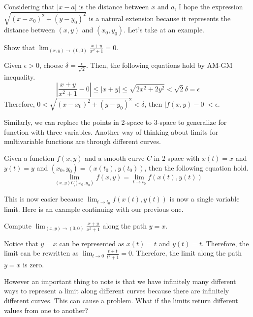 \documentclass[../../../main.tex]{subfiles}
\begin{document}
Considering that $|x - a|$ is the distance between $x$ and $a$,
I hope the expression $\sqrt{(x - x_0)^2 + (y - y_0)^2}$ is a
natural extension because it represents the distance between
$(x, y)$ and $(x_0, y_0)$. Let's take at an example.

\begin{problem}{}{}
Show that $\lim_{(x, y) \to (0, 0)} \frac{x + y}{x^2 + 1} = 0$.
\end{problem}
\begin{solution}
Given $\epsilon > 0$, choose $\delta = \frac{\epsilon}{\sqrt{2}}$.
Then, the following equations hold by AM-GM inequality.
\[
\left| \frac{x + y}{x^2 + 1} - 0 \right|
\leq | x + y |
\leq \sqrt{2x^2 + 2y^2}
< \sqrt{2} \delta
= \epsilon
\]
Therefore, $0 < \sqrt{(x - x_0)^2 + (y - y_0)^2} < \delta$,
then $| f(x, y) - 0 | < \epsilon$.
\end{solution}

Similarly, we can replace the points in $2$-space to $3$-space to
generalize for function with three variables. Another way of thinking
about limits for multivariable functions are through different curves.

\begin{definition}{}{}
Given a function $f(x, y)$ and a smooth curve $C$ in $2$-space with
$x(t) = x$ and $y(t) = y$ and $(x_0, y_0) = (x(t_0), y(t_0))$,
then the following equation hold.
\[
\lim_{(x, y) \underset{\to}{C} (x_0, y_0)} f(x, y)
= \lim_{t \to t_0} f(x(t), y(t))
\]
\end{definition}

This is now easier because $\lim_{t \to t_0} f(x(t), y(t))$ is now a
single variable limit. Here is an example continuing with our previous
one.

\begin{problem}{}{}
Compute $\lim_{(x, y) \to (0, 0)} \frac{x + y}{x^2 + 1}$ along the
path $y = x$.
\end{problem}
\begin{solution}
Notice that $y = x$ can be represented as $x(t) = t$ and $y(t) = t$.
Therefore, the limit can be rewritten as $\lim_{t \to 0}
\frac{t + t}{t^2 + 1} = 0$. Therefore, the limit along the path
$y = x$ is zero.
\end{solution}

However an important thing to note is that we have infinitely many
different ways to represent a limit along different curves because
there are infinitely different curves. This can cause a problem.
What if the limits return different values from one to another?
\end{document}
